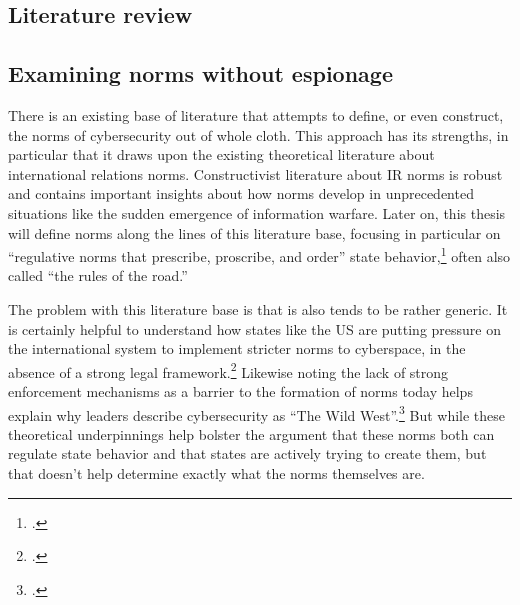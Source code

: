 \documentclass{memoir}
\begin{document}
\begin{refsegment}

\section{Literature review}
\subsection{Examining norms without espionage}
There is an existing base of literature that attempts to define, or even construct, the norms of cybersecurity out of whole cloth. This approach has its strengths, in particular that it draws upon the existing theoretical literature about international relations norms. Constructivist literature about IR norms is robust and contains important insights about how norms develop in unprecedented situations like the sudden emergence of information warfare. Later on, this thesis will define norms along the lines of this literature base, focusing in particular on ``regulative norms that prescribe, proscribe, and order'' state behavior,\footcite{bjorkdahl_norms_2002} often also called ``the rules of the road.''

The problem with this literature base is that is also tends to be rather generic. It is certainly helpful to understand how states like the US are putting pressure on the international system to implement stricter norms to cyberspace, in the absence of a strong legal framework.\footcite[~p.7]{finnemore_constructing_2016} Likewise noting the lack of strong enforcement mechanisms as a barrier to the formation of norms today helps explain why leaders describe cybersecurity as ``The Wild West''.\footcite{iasiello_what_2016} But while these theoretical underpinnings help bolster the argument that these norms both can regulate state behavior and that states are actively trying to create them, but that doesn't help determine exactly what the norms themselves are.


\end{refsegment}
\end{document}
